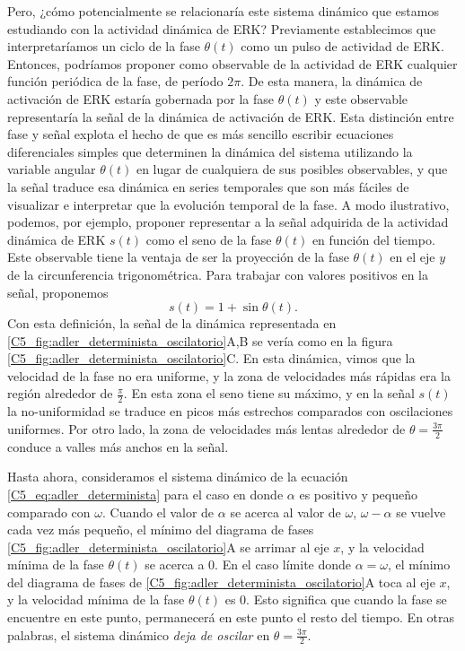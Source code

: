 \documentclass[./main.tex]{subfiles}
\begin{document}
Pero, ¿cómo potencialmente se relacionaría este sistema dinámico que estamos estudiando con la actividad dinámica de ERK? Previamente establecimos que interpretaríamos un ciclo de la fase $\theta(t)$ como un pulso de actividad de ERK. Entonces, podríamos proponer como observable de la actividad de ERK cualquier función periódica de la fase, de período $2\pi$. De esta manera, la dinámica de activación de ERK estaría gobernada por la fase $\theta(t)$ y este observable representaría la señal de la dinámica de activación de ERK. Esta distinción entre fase y señal explota el hecho de que es más sencillo escribir ecuaciones diferenciales simples que determinen la dinámica del sistema utilizando la variable angular $\theta(t)$ en lugar de cualquiera de sus posibles observables, y que la señal traduce esa dinámica en series temporales que son más fáciles de visualizar e interpretar que la evolución temporal de la fase. A modo ilustrativo, podemos, por ejemplo, proponer representar a la señal adquirida de la actividad dinámica de ERK $s(t)$ como el seno de la fase $\theta(t)$ en función del tiempo. Este observable tiene la ventaja de ser la proyección de la fase $\theta(t)$ en el eje $y$ de la circunferencia trigonométrica. Para trabajar con valores positivos en la señal, proponemos 
\begin{equation}
    s(t) = 1+\sin{\theta(t)}.
    \label{C5_eq:seno_fase}
\end{equation}
Con esta definición, la señal de la dinámica representada en \ref{C5_fig:adler_determinista_oscilatorio}A,B se vería como en la figura \ref{C5_fig:adler_determinista_oscilatorio}C. En esta dinámica, vimos que la velocidad de la fase no era uniforme, y la zona de velocidades más rápidas era la región alrededor de $\frac{\pi}{2}$. En esta zona el seno tiene su máximo, y en la señal $s(t)$ la no-uniformidad se traduce en picos más estrechos comparados con oscilaciones uniformes. Por otro lado, la zona de velocidades más lentas alrededor de $\theta = \frac{3 \pi}{2}$ conduce a valles más anchos en la señal. 


Hasta ahora, consideramos el sistema dinámico de la ecuación \ref{C5_eq:adler_determinista} para el caso en donde $\alpha$ es positivo y pequeño comparado con $\omega$. Cuando el valor de $\alpha$ se acerca al valor de $\omega$, $\omega - \alpha$ se vuelve cada vez más pequeño, el mínimo del diagrama de fases \ref{C5_fig:adler_determinista_oscilatorio}A se arrimar al eje $x$, y la velocidad mínima de la fase $\theta(t)$ se acerca a $0$. En el caso límite donde $\alpha = \omega$, el mínimo del diagrama de fases de \ref{C5_fig:adler_determinista_oscilatorio}A toca al eje $x$, y la velocidad mínima de la fase $\theta(t)$ es $0$. Esto significa que cuando la fase se encuentre en este punto, permanecerá en este punto el resto del tiempo. En otras palabras, el sistema dinámico \emph{deja de oscilar} en $\theta = \frac{3 \pi}{2}$.
\end{document}
